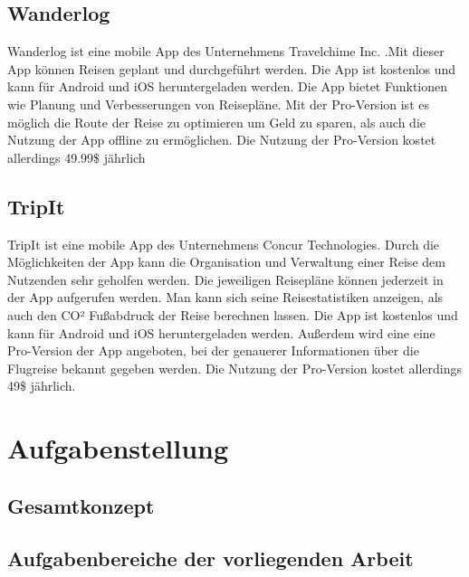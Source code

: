 \subsection{Wanderlog}
\cite{Sewell} Wanderlog ist eine mobile App des Unternehmens Travelchime Inc. .Mit dieser App können Reisen geplant und durchgeführt werden. Die App ist kostenlos und kann für Android und iOS heruntergeladen werden. Die App bietet Funktionen wie Planung und Verbesserungen von Reisepläne. Mit der Pro-Version ist es möglich die Route der Reise zu optimieren um Geld zu sparen, als auch die Nutzung der App offline zu ermöglichen. Die Nutzung der Pro-Version kostet allerdings 49.99\$ jährlich


\subsection{TripIt}
TripIt ist eine mobile App des Unternehmens Concur Technologies. Durch die Möglichkeiten der App kann die Organisation und Verwaltung einer Reise dem Nutzenden sehr geholfen werden. Die jeweiligen Reisepläne können jederzeit in der App aufgerufen werden. Man kann sich seine Reisestatistiken anzeigen, als auch den CO² Fußabdruck der Reise berechnen lassen. Die App ist kostenlos und kann für Android und iOS heruntergeladen werden. Außerdem wird eine eine Pro-Version der App angeboten, bei der genauerer Informationen über die Flugreise bekannt gegeben werden. Die Nutzung der Pro-Version kostet allerdings 49\$ jährlich.
\cite{TripIt}

\section{Aufgabenstellung}


\begin{spacing}{2}
\subsection{Gesamtkonzept}
\end{spacing}

\begin{spacing}{2}
\subsection{Aufgabenbereiche der vorliegenden Arbeit}
\end{spacing}

